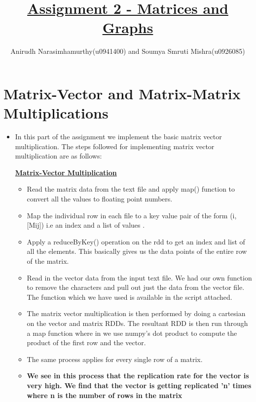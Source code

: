 \documentclass[11pt]{article}
\title{\textbf{\underline{Assignment 2 - Matrices and Graphs}}}
\author{Anirudh Narasimhamurthy(u0941400) and Soumya Smruti Mishra(u0926085)}
\begin{document}
\maketitle

\section{Matrix-Vector and Matrix-Matrix Multiplications}



\begin{itemize}

\item[] In this part of the assignment we implement the basic matrix vector multiplication. The steps followed for implementing matrix vector multiplication are as follows:


\textbf{\underline{Matrix-Vector Multiplication}}

\begin {itemize}

\item Read the matrix data from the text file and apply map() function to convert all the values to floating point numbers.

\item Map the individual row in each file to a key value pair of the form (i, [Mij]) i.e an index and a list of values .

\item Apply a reduceByKey() operation on the rdd to get an index and list of all the elements. This basically gives us the data points of the entire row of the matrix. 

\item Read in the vector data from the input text file. We had our own function to remove the characters and pull out just the data from the vector file. The function which we have used is available in the script attached.

\item The matrix vector multiplication is then performed by doing a cartesian on the vector and matrix RDDs. The resultant RDD is then run  through a map function  where in we use numpy's dot product to compute the product of the first row and the vector.

\item The same process applies for  every single row of a matrix.

\item \textbf{ We see in this process that the replication rate for the vector is very high. We find that the vector is getting replicated 'n' times where n is the number of rows in the matrix}
\end{itemize}



\end{itemize}
\end{document}
